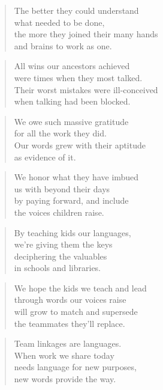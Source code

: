 \documentclass[10pt,a4paper]{article}
\begin{document}
\begin{paracol}{2}
\begin{verse}
The better they could understand\\
what needed to be done,\\
the more they joined their many hands\\
and brains to work as one.
\end{verse}

\begin{verse}
All wins our ancestors achieved\\
were times when they most talked.\\
Their worst mistakes were ill-conceived\\
when talking had been blocked.
\end{verse}

\begin{verse}
We owe such massive gratitude\\
for all the work they did.\\
Our words grew with their aptitude\\
as evidence of it.
\end{verse}

\begin{verse}
We honor what they have imbued\\
us with beyond their days\\
by paying forward, and include\\
the voices children raise.
\end{verse}

\begin{verse}
By teaching kids our languages,\\
we’re giving them the keys\\
deciphering the valuables\\
in schools and libraries.
\end{verse}

\begin{verse}
We hope the kids we teach and lead\\
through words our voices raise\\
will grow to match and supersede\\
the teammates they’ll replace.
\end{verse}

\begin{verse}
Team linkages are languages.\\
When work we share today\\
needs language for new purposes,\\
new words provide the way.
\end{verse}


\end{paracol}
\end{document}
